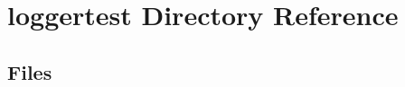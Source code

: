 \section{loggertest Directory Reference}
\label{dir_78fb2876839a44144d8067e0a30b83e2}
\subsection*{Files}
\begin{DoxyCompactItemize}
\end{DoxyCompactItemize}
